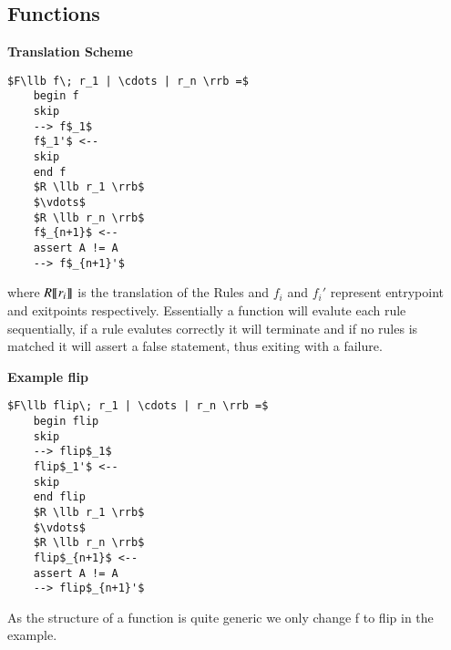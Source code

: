 \documentclass[a4paper]{article}
\begin{document}
\subsection{Functions}
\label{sec:org3d08cea}
\begin{minipage}[t]{0.6\textwidth}
\textbf{Translation Scheme}
\begin{lstlisting}
$F\llb f\; r_1 | \cdots | r_n \rrb =$
    begin f
    skip
    --> f$_1$
    f$_1'$ <--
    skip
    end f
    $R \llb r_1 \rrb$
    $\vdots$
    $R \llb r_n \rrb$
    f$_{n+1}$ <--
    assert A != A
    --> f$_{n+1}'$
\end{lstlisting}
where \(R \llbracket r_i \rrbracket\) is the translation of the Rules and \(f_i\) and  \(f_i'\) represent entrypoint and exitpoints respectively. Essentially a function will evalute each rule sequentially, if a rule evalutes correctly it will terminate and if no rules is matched it will assert a false statement, thus exiting with a failure.
\end{minipage}
\qquad
\begin{minipage}[t]{0.4\textwidth}
\textbf{Example flip}
\begin{lstlisting}
$F\llb flip\; r_1 | \cdots | r_n \rrb =$
    begin flip
    skip
    --> flip$_1$
    flip$_1'$ <--
    skip
    end flip
    $R \llb r_1 \rrb$
    $\vdots$
    $R \llb r_n \rrb$
    flip$_{n+1}$ <--
    assert A != A
    --> flip$_{n+1}'$
\end{lstlisting}
As the structure of a function is quite generic we only change f to flip in the example.
\end{minipage}
\end{document}
